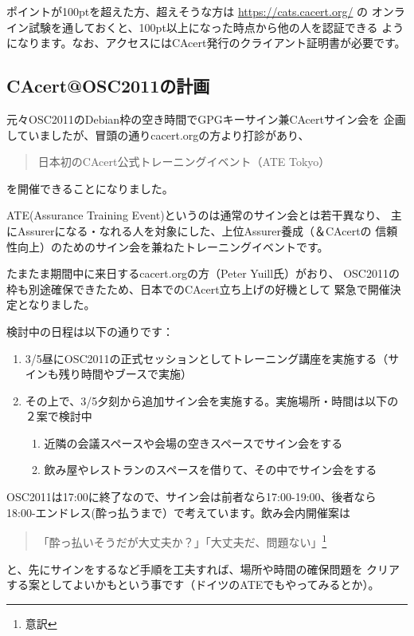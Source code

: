 \documentclass[mingoth,a4paper]{jsarticle}
\begin{document}
ポイントが100ptを超えた方、超えそうな方は \url{https://cats.cacert.org/} の
オンライン試験を通しておくと、100pt以上になった時点から他の人を認証できる
ようになります。なお、アクセスにはCAcert発行のクライアント証明書が必要です。

\subsection{CAcert@OSC2011の計画}
元々OSC2011のDebian枠の空き時間でGPGキーサイン兼CAcertサイン会を
企画していましたが、冒頭の通りcacert.orgの方より打診があり、
\begin{quote}
\Large{日本初のCAcert公式トレーニングイベント（ATE Tokyo）}
\end{quote}
を開催できることになりました。

ATE(Assurance Training Event)というのは通常のサイン会とは若干異なり、
主にAssurerになる・なれる人を対象にした、上位Assurer養成（＆CAcertの
信頼性向上）のためのサイン会を兼ねたトレーニングイベントです。

たまたま期間中に来日するcacert.orgの方（Peter Yuill氏）がおり、
OSC2011の枠も別途確保できたため、日本でのCAcert立ち上げの好機として
緊急で開催決定となりました。

検討中の日程は以下の通りです：
\begin{enumerate}
\item 3/5昼にOSC2011の正式セッションとしてトレーニング講座を実施する（サインも残り時間やブースで実施）
\item その上で、3/5夕刻から追加サイン会を実施する。実施場所・時間は以下の２案で検討中
\begin{enumerate}
\item 近隣の会議スペースや会場の空きスペースでサイン会をする
\item 飲み屋やレストランのスペースを借りて、その中でサイン会をする
\end{enumerate}
\end{enumerate}

OSC2011は17:00に終了なので、サイン会は前者なら17:00-19:00、後者なら
18:00-エンドレス(酔っ払うまで）で考えています。飲み会内開催案は
\begin{quote}
\Large{「酔っ払いそうだが大丈夫か？」「大丈夫だ、問題ない」\footnote{意訳}}
\end{quote}
と、先にサインをするなど手順を工夫すれば、場所や時間の確保問題を
クリアする案としてよいかもという事です（ドイツのATEでもやってみるとか）。
\end{document}
